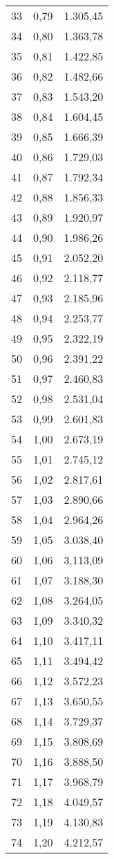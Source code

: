 \documentclass[]{article}
\begin{document}
\begin{longtable}[t]{ccc}
33 & 0,79 & 1.305,45\\
34 & 0,80 & 1.363,78\\
35 & 0,81 & 1.422,85\\
36 & 0,82 & 1.482,66\\
37 & 0,83 & 1.543,20\\
38 & 0,84 & 1.604,45\\
39 & 0,85 & 1.666,39\\
40 & 0,86 & 1.729,03\\
41 & 0,87 & 1.792,34\\
42 & 0,88 & 1.856,33\\
43 & 0,89 & 1.920,97\\
44 & 0,90 & 1.986,26\\
45 & 0,91 & 2.052,20\\
46 & 0,92 & 2.118,77\\
47 & 0,93 & 2.185,96\\
48 & 0,94 & 2.253,77\\
49 & 0,95 & 2.322,19\\
50 & 0,96 & 2.391,22\\
51 & 0,97 & 2.460,83\\
52 & 0,98 & 2.531,04\\
53 & 0,99 & 2.601,83\\
54 & 1,00 & 2.673,19\\
55 & 1,01 & 2.745,12\\
56 & 1,02 & 2.817,61\\
57 & 1,03 & 2.890,66\\
58 & 1,04 & 2.964,26\\
59 & 1,05 & 3.038,40\\
60 & 1,06 & 3.113,09\\
61 & 1,07 & 3.188,30\\
62 & 1,08 & 3.264,05\\
63 & 1,09 & 3.340,32\\
64 & 1,10 & 3.417,11\\
65 & 1,11 & 3.494,42\\
66 & 1,12 & 3.572,23\\
67 & 1,13 & 3.650,55\\
68 & 1,14 & 3.729,37\\
69 & 1,15 & 3.808,69\\
70 & 1,16 & 3.888,50\\
71 & 1,17 & 3.968,79\\
72 & 1,18 & 4.049,57\\
73 & 1,19 & 4.130,83\\
74 & 1,20 & 4.212,57\\*
\end{longtable}
\end{document}
